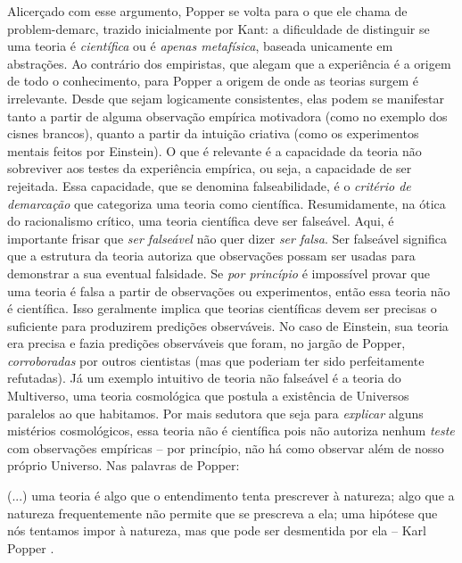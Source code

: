 \documentclass[./main.tex]{subfiles}
\begin{document}
\par Alicerçado com esse argumento, Popper se volta para o que ele chama de \gls{problem-demarc}, trazido inicialmente por Kant: a dificuldade de distinguir se uma teoria é \textit{científica} ou é \textit{apenas metafísica}, baseada unicamente em abstrações. Ao contrário dos empiristas, que alegam que a experiência é a origem de todo o conhecimento, para Popper a origem de onde as teorias surgem é irrelevante. Desde que sejam logicamente consistentes, elas podem se manifestar tanto a partir de alguma observação empírica motivadora (como no exemplo dos cisnes brancos), quanto a partir da intuição criativa (como os experimentos mentais feitos por Einstein). O que é relevante é a capacidade da teoria não sobreviver aos testes da experiência empírica, ou seja, a capacidade de ser rejeitada. Essa capacidade, que se denomina \gls{falseabilidade}, é o \textit{critério de demarcação} que categoriza uma teoria como científica. Resumidamente, na ótica do racionalismo crítico, uma teoria científica deve ser falseável. Aqui, é importante frisar que \textit{ser falseável }não quer dizer \textit{ser falsa}. Ser falseável significa que a estrutura da teoria autoriza que observações possam ser usadas para demonstrar a sua eventual falsidade. Se \textit{por princípio} é impossível provar que uma teoria é falsa a partir de observações ou experimentos, então essa teoria não é científica. Isso geralmente implica que teorias científicas devem ser precisas o suficiente para produzirem predições observáveis. No caso de Einstein, sua teoria era precisa e fazia predições observáveis que foram, no jargão de Popper, \textit{corroboradas} por outros cientistas (mas que poderiam ter sido perfeitamente refutadas). Já um exemplo intuitivo de teoria não falseável é a teoria do Multiverso, uma teoria cosmológica que postula a existência de Universos paralelos ao que habitamos. Por mais sedutora que seja para \textit{explicar} alguns mistérios cosmológicos, essa teoria não é científica pois não autoriza nenhum \textit{teste} com observações empíricas – por princípio, não há como observar além de nosso próprio Universo. Nas palavras de Popper: 

\begin{adjustwidth}{100pt}{0pt}
\medskip
\small (...) uma teoria é algo que o entendimento tenta prescrever à natureza; algo que a natureza frequentemente não permite que se prescreva a ela; uma hipótese que nós tentamos impor à natureza, mas que pode ser desmentida por ela -- Karl Popper \cite{popper2013dois}.
\medskip
\end{adjustwidth}
\end{document}

